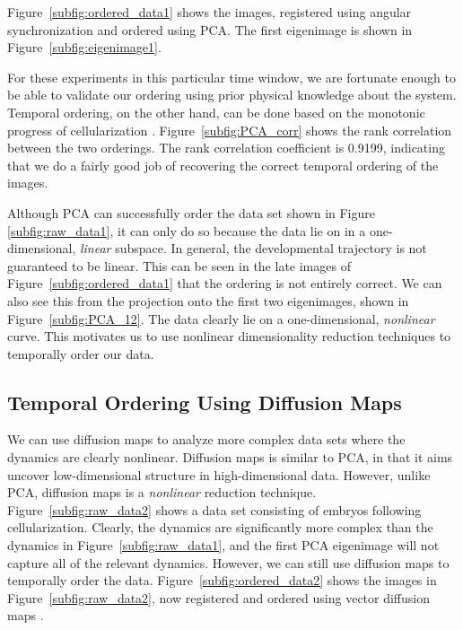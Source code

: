 \documentclass{pnastwo}
\begin{document}
\begin{article}
Figure~\ref{subfig:ordered_data1} shows the images, registered using angular synchronization and ordered using PCA. 
%
The first eigenimage is shown in Figure~\ref{subfig:eigenimage1}.

For these experiments in this particular time window, we are fortunate enough to be able to validate our  ordering using prior physical knowledge about the system.
%
Temporal ordering, on the other hand, can be done based on the monotonic progress of cellularization \cite{figard2013plasma}.%
%
Figure~\ref{subfig:PCA_corr} shows the rank correlation between the two orderings.
%
The rank correlation coefficient is 0.9199, indicating that we do a fairly good job of recovering the correct temporal ordering of the images. 

Although PCA can successfully order the data set shown in Figure \ref{subfig:raw_data1}, it can only do so because the data lie on in a one-dimensional, {\it linear} subspace.
%
In general, the developmental trajectory is not guaranteed to be linear. 
%
This can be seen in the late images of Figure~\ref{subfig:ordered_data1} that the ordering is not entirely correct.
%
We can also see this from the projection onto the first two eigenimages, shown in Figure~\ref{subfig:PCA_12}.
%
The data clearly lie on a one-dimensional, {\em nonlinear} curve.
%
This motivates us to use nonlinear dimensionality reduction techniques to temporally order our data.

\subsection{Temporal Ordering Using Diffusion Maps}

We can use diffusion maps \cite{coifman2005geometric} to analyze more complex data sets where the dynamics are clearly nonlinear.
%
Diffusion maps is similar to PCA, in that it aims uncover low-dimensional structure in high-dimensional data.
%
However, unlike PCA, diffusion maps is a {\it nonlinear} reduction technique. 
%
Figure~\ref{subfig:raw_data2} shows a data set consisting of embryos following cellularization.
%
Clearly, the dynamics are significantly more complex than the dynamics in Figure~\ref{subfig:raw_data1}, and the first PCA eigenimage will not capture all of the relevant dynamics.
%
However, we can still use diffusion maps to temporally order the data.
%
Figure~\ref{subfig:ordered_data2} shows the images in Figure~\ref{subfig:raw_data2}, now registered and ordered using vector diffusion maps \cite{singer2012vector}.


\end{article}
\end{document}
